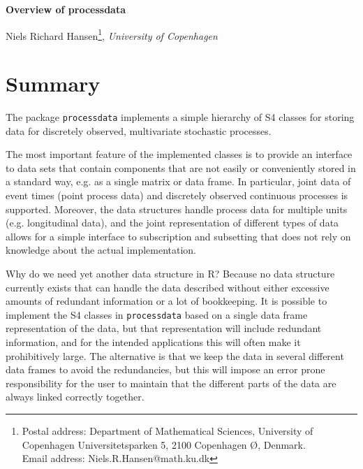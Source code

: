 \documentclass[11pt,a4paper,twoside]{article}
\begin{document}
\pagestyle{fancy}

\renewcommand{\sectionmark}[1]{\markright{#1}{}}
\fancyhf{}
\fancyhead[LE,RO]{\bf \thepage}
\fancyhead[RE]{\bf }


\thispagestyle{empty} 

\begin{center} 
{\Huge \bf Overview of processdata} \\ \vskip 3mm

 Niels Richard Hansen\footnote{Postal address: Department of Mathematical Sciences, University
of Copenhagen Universitetsparken 5, 2100 Copenhagen \O, Denmark. \\
Email address: Niels.R.Hansen@math.ku.dk}, \emph{University of Copenhagen} \\
\end{center}


\section{Summary}

The package \verb+processdata+ implements a simple hierarchy of S4
classes for storing data for discretely observed, multivariate
stochastic processes. 

The most important feature of the implemented classes is to provide an
interface to data sets that contain components that are not easily or
conveniently stored in a standard way, e.g. as a single matrix or data
frame. In particular, joint data of event times (point process data)
and discretely observed continuous processes is supported. Moreover,
the data structures handle process data for multiple units
(e.g. longitudinal data), and the joint representation of different
types of data allows for a simple interface to subscription and
subsetting that does not rely on knowledge about the actual
implementation.

Why do we need yet another data structure in R? Because no data
structure currently exists that can handle the data described without
either excessive amounts of redundant information or a lot of
bookkeeping. It is possible to implement the S4 classes in
\verb+processdata+ based on a single data frame representation of the
data, but that representation will include redundant information,
and for the intended applications this will often make it
prohibitively large. The alternative is that we keep the data in
several different data frames to avoid the redundancies, but this will
impose an error prone responsibility for the user to maintain 
that the different parts of the data are always linked correctly
together.
\end{document}
